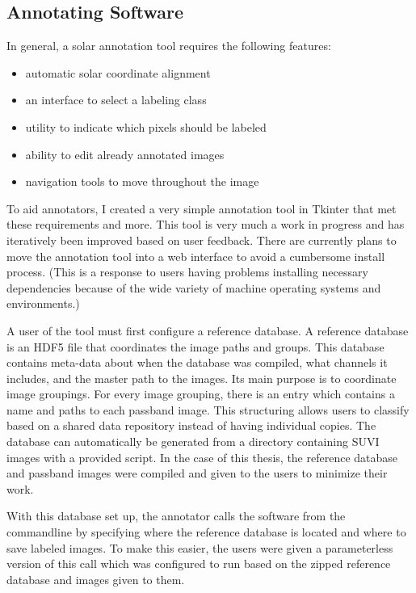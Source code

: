 \documentclass[twoside]{report}
\begin{document}
\subsection{Annotating Software}\label{sec:annotatesoftware}
In general, a solar annotation tool requires the following features:
\begin{itemize}
\item automatic solar coordinate alignment 
\item an interface to select a labeling class
\item utility to indicate which pixels should be labeled
\item ability to edit already annotated images
\item navigation tools to move throughout the image
\end{itemize}

To aid annotators, I created a very simple annotation tool in Tkinter that met these requirements and more. This tool is very much a work in progress and has iteratively been improved based on user feedback. There are currently plans to move the annotation tool into a web interface to avoid a cumbersome install process. (This is a response to users having problems installing necessary dependencies because of the wide variety of machine operating systems and environments.) 

A user of the tool must first configure a reference database. A reference database is an HDF5 file that coordinates the image paths and groups. This database contains meta-data about when the database was compiled, what channels it includes, and the master path to the images. Its main purpose is to coordinate image groupings. For every image grouping, there is an entry which contains a name and paths to each passband image. This structuring allows users to classify based on a shared data repository instead of having individual copies. The database can automatically be generated from a directory containing SUVI images with a provided script. In the case of this thesis, the reference database and passband images were compiled and given to the users to minimize their work. 

With this database set up, the annotator calls the software from the commandline by specifying where the reference database is located and where to save labeled images. To make this easier, the users were given a parameterless version of this call which was configured to run based on the zipped reference database and images given to them. 
\end{document}
